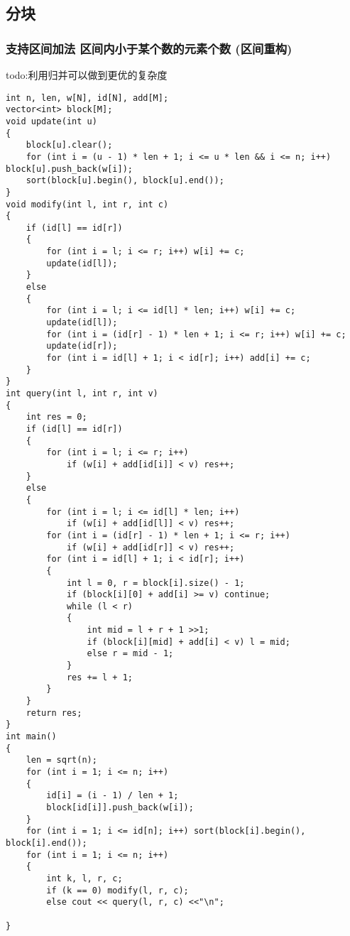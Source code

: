\documentclass[a4paper, fontset=none]{ctexart}
\begin{document}
\subsection{分块}
\subsubsection{支持区间加法 区间内小于某个数的元素个数 (区间重构)}
todo:利用归并可以做到更优的复杂度
\begin{verbatim}
int n, len, w[N], id[N], add[M];
vector<int> block[M];
void update(int u)
{
    block[u].clear();
    for (int i = (u - 1) * len + 1; i <= u * len && i <= n; i++) block[u].push_back(w[i]);
    sort(block[u].begin(), block[u].end());
}
void modify(int l, int r, int c)
{
    if (id[l] == id[r])
    {
        for (int i = l; i <= r; i++) w[i] += c;
        update(id[l]);
    }
    else
    {
        for (int i = l; i <= id[l] * len; i++) w[i] += c;
        update(id[l]);
        for (int i = (id[r] - 1) * len + 1; i <= r; i++) w[i] += c;
        update(id[r]);
        for (int i = id[l] + 1; i < id[r]; i++) add[i] += c;
    }
}
int query(int l, int r, int v)
{
    int res = 0;
    if (id[l] == id[r])
    {
        for (int i = l; i <= r; i++)
            if (w[i] + add[id[i]] < v) res++;
    }
    else
    {
        for (int i = l; i <= id[l] * len; i++)
            if (w[i] + add[id[l]] < v) res++;
        for (int i = (id[r] - 1) * len + 1; i <= r; i++)
            if (w[i] + add[id[r]] < v) res++;
        for (int i = id[l] + 1; i < id[r]; i++)
        {
            int l = 0, r = block[i].size() - 1;
            if (block[i][0] + add[i] >= v) continue;
            while (l < r)
            {
                int mid = l + r + 1 >>1;
                if (block[i][mid] + add[i] < v) l = mid;
                else r = mid - 1;
            }
            res += l + 1;
        }
    }
    return res;
}
int main()
{
    len = sqrt(n);
    for (int i = 1; i <= n; i++)
    {
        id[i] = (i - 1) / len + 1;
        block[id[i]].push_back(w[i]);
    }
    for (int i = 1; i <= id[n]; i++) sort(block[i].begin(), block[i].end());
    for (int i = 1; i <= n; i++)
    {
        int k, l, r, c;
        if (k == 0) modify(l, r, c);
        else cout << query(l, r, c) <<"\n";

}
\end{verbatim}
\end{document}
